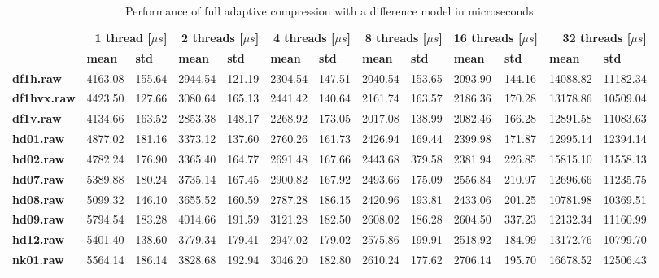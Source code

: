 \begin{table}[ht!]
\centering
\small
\begin{tabular}{l|ll|ll|ll|ll|ll|ll}
    & \multicolumn{2}{r|}{\textbf{1 thread [$\mu s$]}} & \multicolumn{2}{r|}{\textbf{2 threads [$\mu s$]}} & \multicolumn{2}{r|}{\textbf{4 threads [$\mu s$]}} & \multicolumn{2}{r|}{\textbf{8 threads [$\mu s$]}} & \multicolumn{2}{r|}{\textbf{16 threads [$\mu s$]}} & \multicolumn{2}{r}{\textbf{32 threads [$\mu s$]}} \\
    & \textbf{mean} & \textbf{std} & \textbf{mean} & \textbf{std} & \textbf{mean} & \textbf{std} & \textbf{mean} & \textbf{std} & \textbf{mean} & \textbf{std} & \textbf{mean} & \textbf{std} \\
\hline
    \textbf{df1h.raw} & 4163.08 & 155.64 & 2944.54 & 121.19 & 2304.54 & 147.51 & 2040.54 & 153.65 & 2093.90 & 144.16 & 14088.82 & 11182.34 \\
    \textbf{df1hvx.raw} & 4423.50 & 127.66 & 3080.64 & 165.13 & 2441.42 & 140.64 & 2161.74 & 163.57 & 2186.36 & 170.28 & 13178.86 & 10509.04 \\
    \textbf{df1v.raw} & 4134.66 & 163.52 & 2853.38 & 148.17 & 2268.92 & 173.05 & 2017.08 & 138.99 & 2082.46 & 166.28 & 12891.58 & 11083.63 \\
    \textbf{hd01.raw} & 4877.02 & 181.16 & 3373.12 & 137.60 & 2760.26 & 161.73 & 2426.94 & 169.44 & 2399.98 & 171.87 & 12995.14 & 12394.14 \\
    \textbf{hd02.raw} & 4782.24 & 176.90 & 3365.40 & 164.77 & 2691.48 & 167.66 & 2443.68 & 379.58 & 2381.94 & 226.85 & 15815.10 & 11558.13 \\
    \textbf{hd07.raw} & 5389.88 & 180.24 & 3735.14 & 167.45 & 2900.82 & 167.92 & 2493.66 & 175.09 & 2556.84 & 210.97 & 12696.66 & 11235.75 \\
    \textbf{hd08.raw} & 5099.32 & 146.10 & 3655.52 & 160.59 & 2787.28 & 186.15 & 2420.96 & 193.81 & 2433.06 & 201.25 & 10781.98 & 10369.51 \\
    \textbf{hd09.raw} & 5794.54 & 183.28 & 4014.66 & 191.59 & 3121.28 & 182.50 & 2608.02 & 186.28 & 2604.50 & 337.23 & 12132.34 & 11160.99 \\
    \textbf{hd12.raw} & 5401.40 & 138.60 & 3779.34 & 179.41 & 2947.02 & 179.02 & 2575.86 & 199.91 & 2518.92 & 184.99 & 13172.76 & 10799.70 \\
    \textbf{nk01.raw} & 5564.14 & 186.14 & 3828.68 & 192.94 & 3046.20 & 182.80 & 2610.24 & 177.62 & 2706.14 & 195.70 & 16678.52 & 12506.43 \\
\end{tabular}
\caption{Performance of full adaptive compression with a difference model in microseconds}
\end{table}
